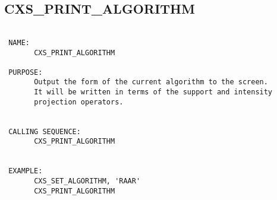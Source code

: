 \subsection{CXS\_PRINT\_ALGORITHM}
\begin{verbatim}

 NAME:
       CXS_PRINT_ALGORITHM

 PURPOSE:
       Output the form of the current algorithm to the screen. 
       It will be written in terms of the support and intensity
       projection operators.


 CALLING SEQUENCE:
       CXS_PRINT_ALGORITHM


 EXAMPLE:
       CXS_SET_ALGORITHM, 'RAAR'
       CXS_PRINT_ALGORITHM

\end{verbatim}



  
 
